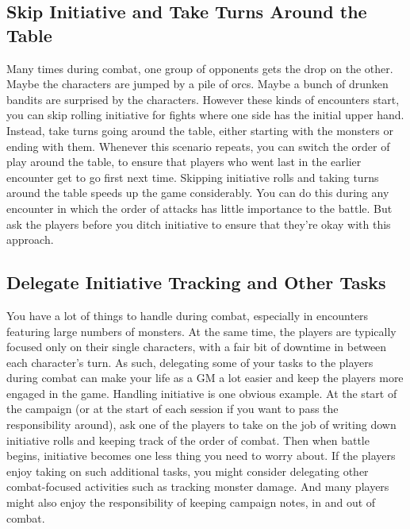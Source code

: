 \documentclass[10pt,a4paper,twoside,bg=print,twocolumn,openany,nodeprecatedcode]{dndbook}
\begin{document}
\subsection{Skip Initiative and Take Turns Around the Table }
Many times during combat, one group of opponents gets the drop on the other.
Maybe the characters are jumped by a pile of orcs. Maybe a bunch of drunken bandits are surprised by the characters. However these kinds of encounters start, you can skip rolling initiative for fights where one side has the initial upper hand.
Instead, take turns going around the table, either starting with the monsters or ending with them. Whenever this scenario repeats, you can switch the order of play around the table, to ensure that players who went last in the earlier encounter get to go first next time.
Skipping initiative rolls and taking turns around the table speeds up the game considerably. You can do this during any encounter in which the order of attacks has little importance to the battle. But ask the players before you ditch initiative to ensure that they're okay with this approach.
\subsection{Delegate Initiative Tracking and Other Tasks}
You have a lot of things to handle during combat, especially in encounters featuring large numbers of monsters. At the same time, the players are typically focused only on their single characters, with a fair bit of downtime in between each character's turn. As such, delegating some of your tasks to the players during combat can make your life as a GM a lot easier and keep the players more engaged in the game.
Handling initiative is one obvious example. At the start of the campaign (or at the start of each session if you want to pass the responsibility around), ask one of the players to take on the job of writing down initiative rolls and keeping track of the order of combat. Then when battle begins, initiative becomes one less thing you need to worry about.
If the players enjoy taking on such additional tasks, you might consider delegating other combat-focused activities such as tracking monster damage. And many players might also enjoy the responsibility of keeping campaign notes, in and out of combat.
\end{document}
